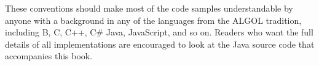These conventions should make most of the code samples understandable by
anyone with a background in any of the languages from the ALGOL tradition,
including B, C, C++, C\# Java, JavaScript, and so on.  Readers who want
the full details of all implementations are encouraged to look at the
Java source code that accompanies this book.


